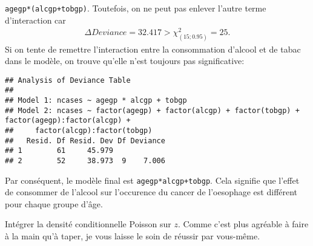 \begin{solution}{6.1}
\texttt{agegp*(alcgp+tobgp)}. Toutefois, on ne peut pas enlever l'autre terme d'interaction car
\begin{align*}
\Delta Deviance = 32.417 > \chi^{2}_{(15;0.95)}=25.
\end{align*}
Si on tente de remettre l'interaction entre la consommation d'alcool et de tabac dans le modèle, on trouve qu'elle n'est toujours pas significative:
\begin{knitrout}
\color{fgcolor}\begin{kframe}
\begin{alltt}
 \hlkwb{<-}  \hlopt{~}  \hlopt{*}  \hlopt{+} 
 \hlkwb{<-} \hlopt{~}\hlopt{-}\hlopt{:}
\end{alltt}
\begin{verbatim}
## Analysis of Deviance Table
##
## Model 1: ncases ~ agegp * alcgp + tobgp
## Model 2: ncases ~ factor(agegp) + factor(alcgp) + factor(tobgp) + factor(agegp):factor(alcgp) +
##     factor(alcgp):factor(tobgp)
##   Resid. Df Resid. Dev Df Deviance
## 1        61     45.979
## 2        52     38.973  9    7.006
\end{verbatim}
\end{kframe}
\end{knitrout}
Par conséquent, le modèle final est \texttt{agegp*alcgp+tobgp}. Cela signifie que l'effet de consommer de l'alcool sur l'occurence du cancer de l'oesophage est différent pour chaque groupe d'âge.
\end{solution}
\begin{solution}{6.2}
Intégrer la densité conditionnelle Poisson sur $z$. Comme c'est plus agréable à faire à la main qu'à taper, je vous laisse le soin de réussir par vous-même.
\end{solution}

